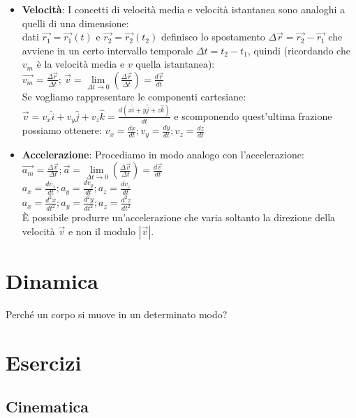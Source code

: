 \documentclass[a4paper,12pt]{report}
\begin{document}
	\begin{itemize}
		\item \textbf{Velocità}: I concetti di velocità media e velocità istantanea sono analoghi a quelli di una dimensione:\\
		dati $\vec{r_1} = \vec{r_1}(t)$ e $\vec{r_2} = \vec{r_2}(t_2)$ definisco lo spostamento $\Delta\vec{r} = \vec{r_2} - \vec{r_1}$ che avviene in un certo intervallo temporale $\Delta t = t_2 - t_1$, quindi (ricordando che $v_m$ è la velocità media e $v$ quella istantanea):\\
		$\vec{v_m} = \frac{\Delta \vec{r}}{\Delta t}$;\;\;\;\;
		$\vec{v} = \lim\limits_{\Delta t \to 0}(\frac{\Delta\vec{r}}{\Delta t}) = \frac{d\vec{r}}{dt}$\\
		Se vogliamo rappresentare le componenti cartesiane:\\$\vec{v} = v_x\hat{i} + v_y\hat{j} + v_z\hat{k} = \frac{d(x\hat{i} + y\hat{j} + z\hat{k})}{dt}$ e scomponendo quest'ultima frazione possiamo ottenere: $v_x = \frac{dx}{dt};$\;\;\;$v_y = \frac{dy}{dt};$\;\;\;$v_z = \frac{dz}{dt}$
		\item \textbf{Accelerazione}: Procediamo in modo analogo con l'accelerazione:\\
		$\vec{a_m} = \frac{\Delta\vec{v}}{\Delta t};$\;\;\;\;$\vec{a} = \lim\limits_{\Delta t\to0}(\frac{\Delta\vec{v}}{\Delta t}) = \frac{d\vec{v}}{dt}$\\
		$a_x = \frac{dv_x}{dt};$\;\;\;\;$a_y = \frac{dv_y}{dt};$\;\;\;\;$a_z = \frac{dv_z}{dt}$\\
		$a_x = \frac{d^2x}{dt^2};$\;\;\;\;$a_y = \frac{d^2y}{dt^2};$\;\;\;\;$a_z = \frac{d^2z}{dt^2}$\\
		È possibile produrre un'accelerazione che varia soltanto la direzione della velocità $\vec{v}$ e non il modulo $|\vec{v}|$.
	\end{itemize}
	\chapter{Dinamica}
	Perché un corpo si muove in un determinato modo?
	\appendix
	\chapter{Esercizi}
	\section{Cinematica}
\end{document}
